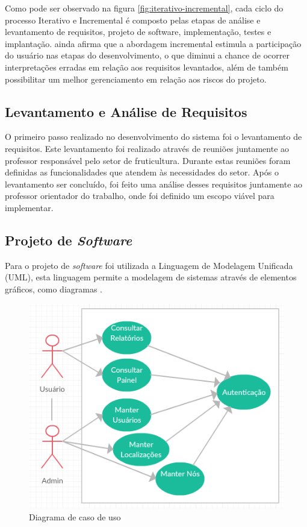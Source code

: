 Como pode ser observado na figura \ref{fig:iterativo-incremental}, cada ciclo do processo Iterativo e Incremental é composto pelas etapas de análise e levantamento de requisitos, projeto de software, implementação, testes e implantação.  ainda afirma que a abordagem incremental estimula a participação do usuário nas etapas do desenvolvimento, o que diminui a chance de ocorrer interpretações erradas em relação aos requisitos levantados, além de também possibilitar um melhor gerenciamento em relação aos riscos do projeto.

\subsection{Levantamento e Análise de Requisitos}
O primeiro passo realizado no desenvolvimento do sistema foi o levantamento de requisitos. Este levantamento foi realizado através de reuniões juntamente ao professor responsável pelo setor de fruticultura. Durante estas reuniões foram definidas as funcionalidades que atendem às necessidades do setor. Após o levantamento ser concluído, foi feito uma análise desses requisitos juntamente ao professor orientador do trabalho, onde foi definido um escopo viável para implementar. 

\subsection{Projeto de \textit{Software}}
Para o projeto de \textit{software} foi utilizada a Linguagem de Modelagem Unificada (UML), esta linguagem permite a modelagem de sistemas através de elementos gráficos, como diagramas \cite{bezerra2017iterativoeincremental}. 

\begin{figure}[H]
    \centering
    \includegraphics[scale=0.8]{04-figuras/caso_de_uso.png}
    \caption{Diagrama de caso de uso}
    \vspace{-\baselineskip}
    \label{fig:caso-de-uso}
\end{figure}

